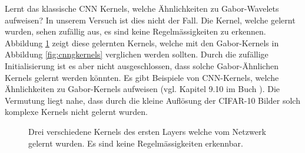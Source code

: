 Lernt das klassische CNN Kernels, welche Ähnlichkeiten zu Gabor-Wavelets aufweisen?
In unserem Versuch ist dies nicht der Fall.
Die Kernel, welche gelernt wurden, sehen zufällig aus, es sind keine Regelmässigkeiten zu erkennen.
Abbildung \ref{fig:cnnkernels} zeigt diese gelernten Kernels, welche mit den Gabor-Kernels in Abbildung \ref{fig:cnngkernels} verglichen werden sollten.
Durch die zufällige Initialisierung ist es aber nicht ausgeschlossen, dass solche Gabor-Ähnlichen Kernels gelernt werden könnten.
Es gibt Beispiele von CNN-Kernels, welche Ähnlichkeiten zu Gabor-Kernels aufweisen (vgl. Kapitel 9.10 im Buch \cite{book:deeplearning}).
Die Vermutung liegt nahe, dass durch die kleine Auflösung der CIFAR-10 Bilder solch komplexe Kernels nicht gelernt wurden.

\begin{figure}
	\centering
	\caption{Drei verschiedene Kernels des ersten Layers welche vom Netzwerk gelernt wurden. Es sind keine Regelmässigkeiten erkennbar.}
	\label{fig:cnnkernels}
\end{figure}

